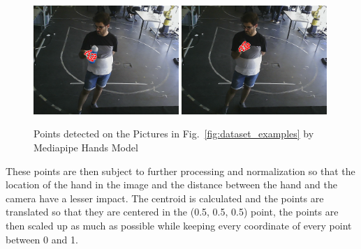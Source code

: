 \begin{figure}[H]
\centerline{\includegraphics[width=0.49\textwidth]{figs/dataset_preprocessing2_1.png} \includegraphics[width=0.49\textwidth]{figs/dataset_preprocessing2_2.png}}
\caption[Points detected on the Pictures in Fig.~\ref{fig:dataset_examples} by Mediapipe Hands Model]{Points detected on the Pictures in Fig.~\ref{fig:dataset_examples} by Mediapipe Hands Model}
\label{fig:dataset_examples2}
\end{figure}

These points are then subject to further processing and normalization so that the location of the hand in the image and the distance between the hand and the camera have a lesser impact. The centroid is calculated and the points are translated so that they are centered in the (0.5, 0.5, 0.5) point, the points are then scaled up as much as possible while keeping every coordinate of every point between 0 and 1.

